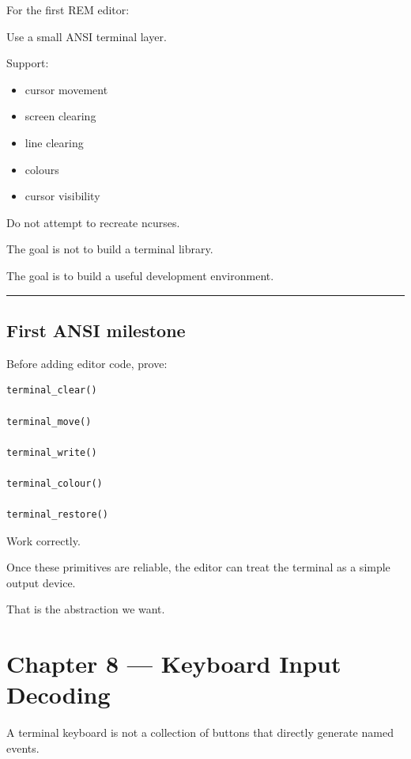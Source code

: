 \documentclass[
  oneside,
  openany]{book}
\providecommand{\tightlist}{%
  \setlength{\itemsep}{0pt}\setlength{\parskip}{0pt}}
\begin{document}
For the first REM editor:

Use a small ANSI terminal layer.

Support:

\begin{itemize}
\tightlist
\item
  cursor movement
\item
  screen clearing
\item
  line clearing
\item
  colours
\item
  cursor visibility
\end{itemize}

Do not attempt to recreate ncurses.

The goal is not to build a terminal library.

The goal is to build a useful development environment.

\begin{center}\rule{0.5\linewidth}{0.5pt}\end{center}

\hypertarget{first-ansi-milestone}{%
\section{First ANSI milestone}\label{first-ansi-milestone}}

Before adding editor code, prove:

\begin{verbatim}
terminal_clear()

terminal_move()

terminal_write()

terminal_colour()

terminal_restore()
\end{verbatim}

Work correctly.

Once these primitives are reliable, the editor can treat the terminal as
a simple output device.

That is the abstraction we want.

\hypertarget{chapter-8-keyboard-input-decoding}{%
\chapter{Chapter 8 --- Keyboard Input
Decoding}\label{chapter-8-keyboard-input-decoding}}

A terminal keyboard is not a collection of buttons that directly
generate named events.
\end{document}
